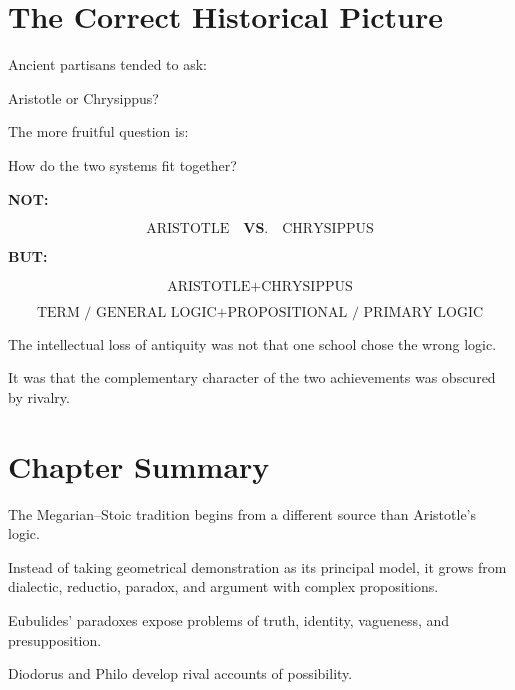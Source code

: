 \documentclass[11pt]{article}
\begin{document}
\section{The Correct Historical Picture}

Ancient partisans tended to ask:

\begin{center}
Aristotle or Chrysippus?
\end{center}

The more fruitful question is:

\begin{center}
How do the two systems fit together?
\end{center}

\begin{whiteboard}
\textbf{NOT:}

\[
\text{ARISTOTLE}
\quad
\mathbf{VS.}
\quad
\text{CHRYSIPPUS}
\]

\vspace{0.6em}

\textbf{BUT:}

\[
\boxed{
\text{ARISTOTLE}
+
\text{CHRYSIPPUS}
}
\]

\[
\boxed{
\text{TERM / GENERAL LOGIC}
+
\text{PROPOSITIONAL / PRIMARY LOGIC}
}
\]
\end{whiteboard}

The intellectual loss of antiquity was not that one school chose
the wrong logic.

It was that the complementary character of the two achievements
was obscured by rivalry.

\section{Chapter Summary}

The Megarian--Stoic tradition begins from a different source than
Aristotle's logic.

Instead of taking geometrical demonstration as its principal
model, it grows from dialectic, reductio, paradox, and argument
with complex propositions.

Eubulides' paradoxes expose problems of truth, identity,
vagueness, and presupposition.

Diodorus and Philo develop rival accounts of possibility.
\end{document}
